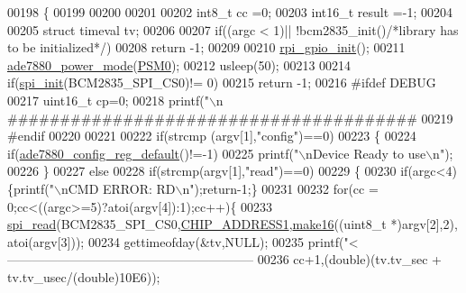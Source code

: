 \begin{DoxyCode}
00198                                          \{
00199     
00200      
00201      
00202     int8\_t cc =0;
00203     int16\_t result =-1;
00204     
00205     \textcolor{keyword}{struct }timeval tv;
00206 
00207      \textcolor{keywordflow}{if}((argc < 1)|| !bcm2835\_init()\textcolor{comment}{/*library has to be initialized*/})   
00208            \textcolor{keywordflow}{return} -1;    
00209      
00210     \hyperlink{a00005_ga156b48448f55534a2f9c805a1f760efa}{rpi\_gpio\_init}();
00211     \hyperlink{a00005_gae9a5abd4e5054e7ea3f149b1764f2cd0}{ade7880\_power\_mode}(\hyperlink{a00037_ad03c0079a6239f78368cb14cc4578101}{PSM0});
00212     usleep(50);
00213     
00214     \textcolor{keywordflow}{if}(\hyperlink{a00005_ga96ddfd5c89b80852982ba50dd18256f6}{spi\_init}(BCM2835\_SPI\_CS0)!= 0)
00215     \textcolor{keywordflow}{return} -1;
00216 \textcolor{preprocessor}{        #ifdef DEBUG }
00217 \textcolor{preprocessor}{}        uint16\_t cp=0;
00218         printf(\textcolor{stringliteral}{"\(\backslash\)n
      #######################################%
00219 \textcolor{preprocessor}{        #endif}
00220 \textcolor{preprocessor}{}     
00221     
00222      \textcolor{keywordflow}{if}(strcmp (argv[1],\textcolor{stringliteral}{"config"})==0)
00223      \{
00224         \textcolor{keywordflow}{if}(\hyperlink{a00005_ga7782772c18e6ea515dcd28dcaedd0f06}{ade7880\_config\_reg\_default}()!=-1)
00225               printf(\textcolor{stringliteral}{"\(\backslash\)nDevice Ready to use\(\backslash\)n"});
00226      \} 
00227      \textcolor{keywordflow}{else} 
00228      \textcolor{keywordflow}{if}(strcmp(argv[1],\textcolor{stringliteral}{"read"})==0)   
00229      \{
00230         \textcolor{keywordflow}{if}(argc<4)\{printf(\textcolor{stringliteral}{"\(\backslash\)nCMD ERROR: RD\(\backslash\)n"});\textcolor{keywordflow}{return}-1;\}
00231           
00232         \textcolor{keywordflow}{for}(cc = 0;cc<((argc>=5)?atoi(argv[4]):1);cc++)\{
00233          \hyperlink{a00007_ga7ad9f65ee46aca507374096506a0b1c4}{spi\_read}(BCM2835\_SPI\_CS0,\hyperlink{a00037_a94de2b046db6e10257ef4481c0a15eaa}{CHIP\_ADDRESS1},\hyperlink{a00009_ga1e74920f34a07a82cca58eab71ed12b3}{make16}((uint8\_t *)argv[2],2),
      atoi(argv[3]));
00234          gettimeofday(&tv,NULL);
00235          printf(\textcolor{stringliteral}{"<----------------------------------------------------------- %
00236          cc+1,(\textcolor{keywordtype}{double})(tv.tv\_sec + tv.tv\_usec/(\textcolor{keywordtype}{double})10E6));
}}
\end{DoxyCode}
